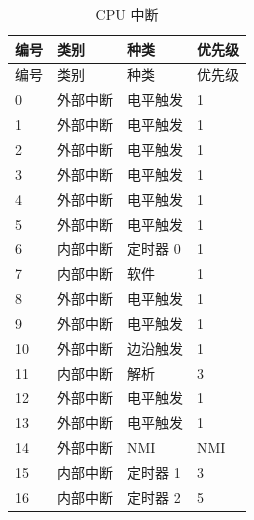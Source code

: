  \begin{longtable}[c]{ |p{1.5cm}|p{4.5cm}|p{4.5cm}|p{4cm}| } 

    \caption{CPU 中断}
    \label{table:CPUInterrupt}\\
    \hline
    \rowcolor{lightgray}
   编号 & 类别     & 种类              & 优先级    \\
    \hline
    \endfirsthead
    
    \hline
    \rowcolor{lightgray}
   编号 & 类别      & 种类             & 优先级    \\
    \hline
    \endhead
    
    \endfoot
    
    \hline
    \endlastfoot
    
    0   & 外部中断    & 电平触发   & 1                 \\
    \hline
    1   & 外部中断    & 电平触发   & 1                 \\
    \hline
    2   & 外部中断    & 电平触发   & 1                 \\
    \hline
    3   & 外部中断    & 电平触发   & 1                 \\
    \hline
    4   & 外部中断    & 电平触发   & 1                 \\
    \hline
    5   & 外部中断    & 电平触发   & 1                 \\
    \hline
    6   & 内部中断      & 定时器 0           & 1                 \\
    \hline
    7   & 内部中断      & 软件          & 1                 \\
    \hline
    8   & 外部中断    & 电平触发   & 1                 \\
    \hline
    9   & 外部中断    & 电平触发   & 1                 \\
    \hline
    10  & 外部中断    & 边沿触发    & 1                 \\
    \hline
    11  & 内部中断      & 解析         & 3                 \\
    \hline
    12  & 外部中断    & 电平触发   & 1                 \\
    \hline
    13  & 外部中断    & 电平触发   & 1                 \\
    \hline
    14  & 外部中断    & NMI               & NMI               \\
    \hline
    15  & 内部中断      & 定时器 1           & 3                 \\
    \hline
    16  & 内部中断      & 定时器 2           & 5                 \\

\end{longtable}
